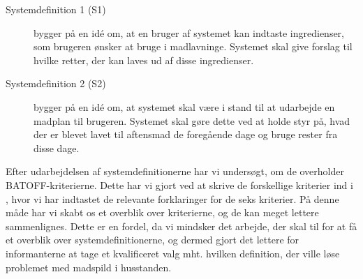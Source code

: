 \begin{description}
\item[Systemdefinition 1 (S1)] bygger på en idé om, at en bruger af systemet kan indtaste ingredienser, som brugeren ønsker at bruge i madlavninge. Systemet skal give forslag til hvilke retter, der kan laves ud af disse ingredienser.
\item[Systemdefinition 2 (S2)] bygger på en idé om, at systemet skal være i stand til at udarbejde en madplan til brugeren. Systemet skal gøre dette ved at holde styr på, hvad der er blevet lavet til aftensmad de foregående dage og bruge rester fra disse dage.
\end{description}

Efter udarbejdelsen af systemdefinitionerne har vi undersøgt, om de overholder BATOFF-kriterierne. Dette har vi gjort ved at skrive de forskellige kriterier ind i , hvor vi har indtastet de relevante forklaringer for de seks kriterier. På denne måde har vi skabt os et overblik over kriterierne, og de kan meget lettere sammenlignes. Dette er en fordel, da vi mindsker det arbejde, der skal til for at få et overblik over systemdefinitionerne, og dermed gjort det lettere for informanterne at tage et kvalificeret valg mht. hvilken definition, der ville løse problemet med madspild i husstanden.

